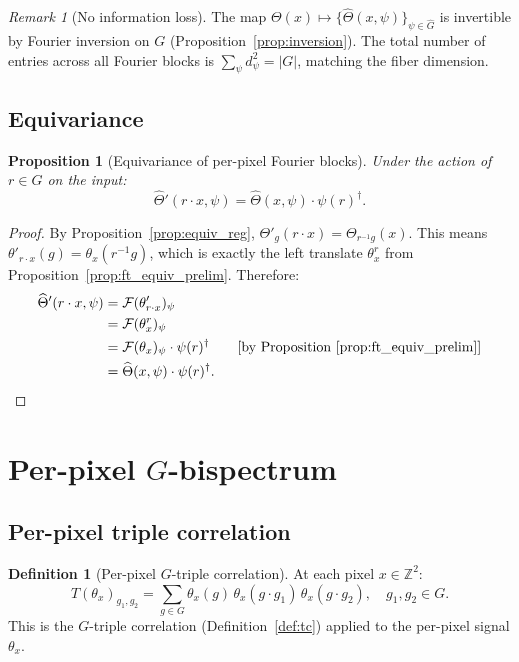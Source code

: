 \documentclass{article}
\newtheorem{proposition}[theorem]{Proposition}
\theoremstyle{definition}
\newtheorem{definition}[theorem]{Definition}
\theoremstyle{remark}
\newtheorem{remark}[theorem]{Remark}
\newcommand{\FF}{\mathcal{F}}
\newcommand{\Z}{\mathbb{Z}}
\newcommand{\Ghat}{\widehat{G}}
\begin{document}
\begin{remark}[No information loss]
The map $\Theta(x) \mapsto \{\widehat{\Theta}(x, \psi)\}_{\psi \in \Ghat}$ is invertible by Fourier inversion on $G$ (Proposition~\ref{prop:inversion}). The total number of entries across all Fourier blocks is $\sum_{\psi} d_\psi^2 = |G|$, matching the fiber dimension.
\end{remark}

\subsection{Equivariance}

\begin{proposition}[Equivariance of per-pixel Fourier blocks]\label{prop:perpixel_ft_equiv}
Under the action of $r \in G$ on the input:
\begin{equation}\label{eq:perpixel_ft_equiv}
\widehat{\Theta}'(r \cdot x, \psi) = \widehat{\Theta}(x, \psi) \cdot \psi(r)^\dagger.
\end{equation}
\end{proposition}
\begin{proof}
By Proposition~\ref{prop:equiv_reg}, $\Theta'_g(r \cdot x) = \Theta_{r^{-1}g}(x)$. This means $\theta'_{r \cdot x}(g) = \theta_x(r^{-1}g)$, which is exactly the left translate $\theta_x^{r}$ from Proposition~\ref{prop:ft_equiv_prelim}. Therefore:
\begin{align*}
\widehat{\Theta}'(r \cdot x, \psi)
&= \FF(\theta'_{r \cdot x})_\psi \\
&= \FF(\theta_x^{r})_\psi \\
&= \FF(\theta_x)_\psi \cdot \psi(r)^\dagger \qquad\text{[by Proposition~\ref{prop:ft_equiv_prelim}]} \\
&= \widehat{\Theta}(x, \psi) \cdot \psi(r)^\dagger. \qedhere
\end{align*}
\end{proof}

\section{Per-pixel $G$-bispectrum}

\subsection{Per-pixel triple correlation}

\begin{definition}[Per-pixel $G$-triple correlation]\label{def:perpixel_tc}
At each pixel $x \in \Z^2$:
\begin{equation}\label{eq:perpixel_tc}
T(\theta_x)_{g_1, g_2} = \sum_{g \in G} \theta_x(g)\, \theta_x(g \cdot g_1)\, \theta_x(g \cdot g_2), \quad g_1, g_2 \in G.
\end{equation}
This is the $G$-triple correlation (Definition~\ref{def:tc}) applied to the per-pixel signal $\theta_x$.
\end{definition}
\end{document}
